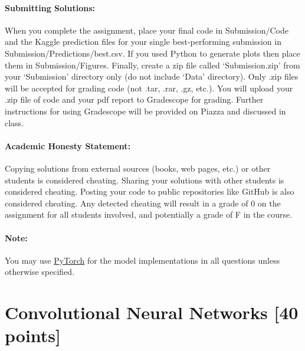 \documentclass[letterpaper]{article}
\begin{document}
\paragraph*{Submitting Solutions:} When you complete the assignment, place your final code in Submission/Code and the Kaggle prediction files for your single best-performing submission in Submission/Predictions/best.csv. If you used Python to generate plots then place them in Submission/Figures. Finally, create a zip file called `Submission.zip' from your `Submission' directory only (do not include `Data' directory). Only .zip files will be accepted for grading code (not .tar, .rar, .gz, etc.). You will upload your .zip file of code and your pdf report to Gradescope for grading. Further instructions for using Gradescope will be provided on Piazza and discussed in class.

\paragraph*{Academic Honesty Statement:} Copying solutions from external sources (books, web pages, etc.) or other students is considered cheating. Sharing your solutions with other students is  considered cheating. Posting your code to public repositories like GitHub is also considered cheating. Any detected cheating will result in a grade of 0 on the assignment for all students involved, and potentially a grade of F in the course.

\paragraph*{Note:} You may use \underline{PyTorch} for the model implementations in all questions unless otherwise specified. \\

\section{Convolutional Neural Networks [40 points]}
\end{document}

